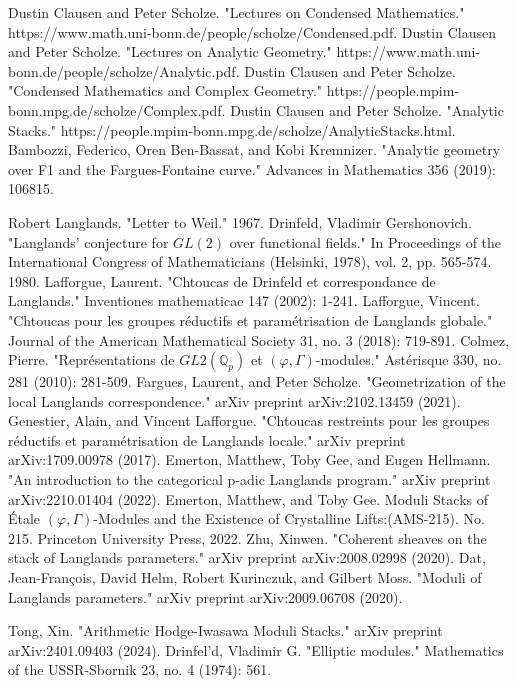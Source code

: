 \documentclass[12pt]{book}
\theoremstyle{definition}
\begin{document}
\begin{thebibliography}{}
 Dustin Clausen and Peter Scholze. "Lectures on Condensed Mathematics." https://www.math.uni-bonn.de/people/scholze/Condensed.pdf.
 Dustin Clausen and Peter Scholze. "Lectures on Analytic Geometry." https://www.math.uni-bonn.de/people/scholze/Analytic.pdf.
 Dustin Clausen and Peter Scholze. "Condensed Mathematics and Complex Geometry." https://people.mpim-bonn.mpg.de/scholze/Complex.pdf.
 Dustin Clausen and Peter Scholze. "Analytic Stacks." https://people.mpim-bonn.mpg.de/scholze/AnalyticStacks.html.
 Bambozzi, Federico, Oren Ben-Bassat, and Kobi Kremnizer. "Analytic geometry over F1 and the Fargues-Fontaine curve." Advances in Mathematics 356 (2019): 106815.



 Robert Langlands. "Letter to Weil." 1967. 
 Drinfeld, Vladimir Gershonovich. "Langlands' conjecture for $GL(2)$ over functional fields." In Proceedings of the International Congress of Mathematicians (Helsinki, 1978), vol. 2, pp. 565-574. 1980.
 Lafforgue, Laurent. "Chtoucas de Drinfeld et correspondance de Langlands." Inventiones mathematicae 147 (2002): 1-241.
 Lafforgue, Vincent. "Chtoucas pour les groupes r\'eductifs et param\'etrisation de Langlands globale." Journal of the American Mathematical Society 31, no. 3 (2018): 719-891. 
 Colmez, Pierre. "Repr\'esentations de $GL2(\mathbb{Q}_p)$ et $(\varphi, \Gamma)$-modules." Ast\'erisque 330, no. 281 (2010): 281-509.
 Fargues, Laurent, and Peter Scholze. "Geometrization of the local Langlands correspondence." arXiv preprint arXiv:2102.13459 (2021).
 Genestier, Alain, and Vincent Lafforgue. "Chtoucas restreints pour les groupes r\'eductifs et param\'etrisation de Langlands locale." arXiv preprint arXiv:1709.00978 (2017).
 Emerton, Matthew, Toby Gee, and Eugen Hellmann. "An introduction to the categorical p-adic Langlands program." arXiv preprint arXiv:2210.01404 (2022).
 Emerton, Matthew, and Toby Gee. Moduli Stacks of \'Etale $(\varphi, \Gamma)$-Modules and the Existence of Crystalline Lifts:(AMS-215). No. 215. Princeton University Press, 2022.
 Zhu, Xinwen. "Coherent sheaves on the stack of Langlands parameters." arXiv preprint arXiv:2008.02998 (2020).
 Dat, Jean-Fran\c{c}ois, David Helm, Robert Kurinczuk, and Gilbert Moss. "Moduli of Langlands parameters." arXiv preprint arXiv:2009.06708 (2020).

 Tong, Xin. "Arithmetic Hodge-Iwasawa Moduli Stacks." arXiv preprint arXiv:2401.09403 (2024). 
 Drinfel'd, Vladimir G. "Elliptic modules." Mathematics of the USSR-Sbornik 23, no. 4 (1974): 561.



\end{thebibliography}
 






	
\end{document}
